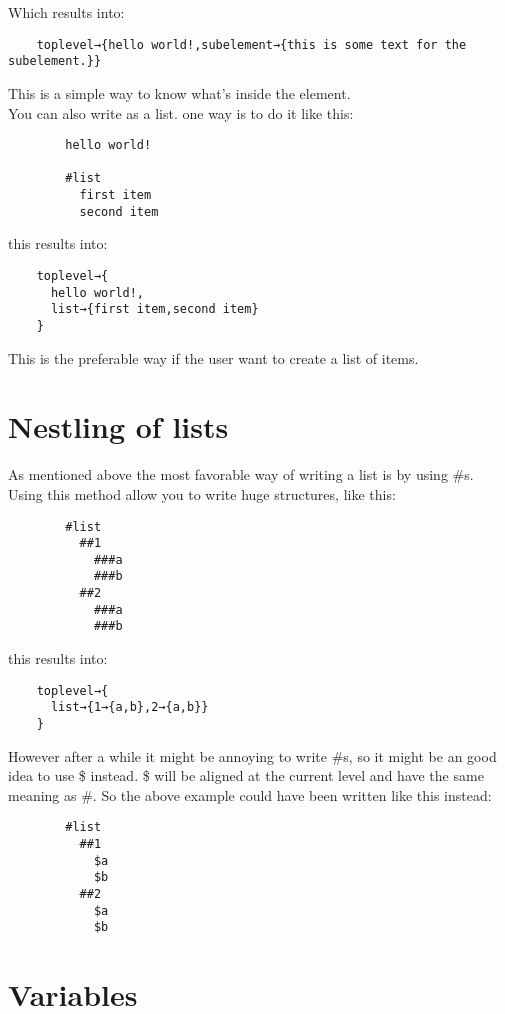 \documentclass{book}
\begin{document}
	Which results into:
	
	\begin{verbatim}
	toplevel→{hello world!,subelement→{this is some text for the subelement.}}
	\end{verbatim}
	
	This is a simple way to know what's inside the element. \\
	You can also write as a list. one way is to do it like this:
	
	\begin{verbatim}
		hello world!
		
		#list
		  first item
		  second item
	\end{verbatim}
	
	this results into:
	
	\begin{verbatim}
	toplevel→{
	  hello world!,
	  list→{first item,second item}
	}
	\end{verbatim}
	
	This is the preferable way if the user want to create a list of items.
	
	\section{Nestling of lists}
	
	As mentioned above the most favorable way of writing a list is by using \#s.
	Using this method allow you to write huge structures, like this:
	
	\begin{verbatim}
		#list
		  ##1
		    ###a
		    ###b
		  ##2
		    ###a
		    ###b
	\end{verbatim}
	
	this results into:
	
	\begin{verbatim}
	toplevel→{
	  list→{1→{a,b},2→{a,b}}
	}
	\end{verbatim}
	
	However after a while it might be annoying to write #s, so it might be an good idea to use \$ instead.
	\$ will be aligned at the current level and have the same meaning as \#.
	So the above example could have been written like this instead:
	
	\begin{verbatim}
		#list
		  ##1
		    $a
		    $b
		  ##2
		    $a
		    $b
	\end{verbatim}
	
	\section{Variables}
	
\end{document}
